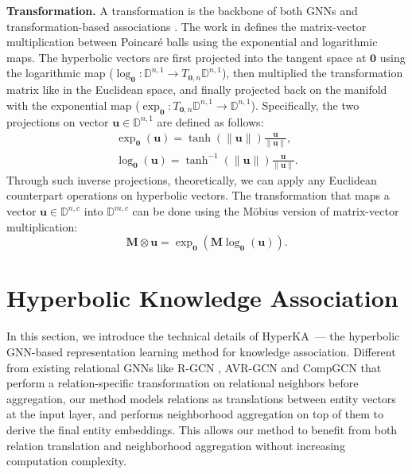\documentclass[11pt,a4paper]{article}
\newcommand{\modelname}{HyperKA\xspace}
\begin{document}
\noindent
\textbf{Transformation.} A transformation is the backbone of both GNNs \cite{HGCNN,HGCN} and transformation-based associations \cite{MTransE,JOIE}. The work in \cite{HNN} defines the matrix-vector multiplication between Poincaré balls using the exponential and logarithmic maps. The hyperbolic vectors are first projected into the tangent space at $\mathbf{0}$ using the logarithmic map ($\log_{\mathbf{0}}:\mathbb{D}^{n,1}\to T_{\mathbf{0},n}\mathbb{D}^{n,1}$), then multiplied the transformation matrix like in the Euclidean space, and finally projected back on the manifold with the exponential map ($\exp_{\mathbf{0}}:T_{\mathbf{0},n}\mathbb{D}^{n,1}\to \mathbb{D}^{n,1}$). Specifically, the two projections on vector $\mathbf{u}\in\mathbb{D}^{n,1}$ are defined as follows:
\begin{align}\label{eq:exp}
	\exp_{\mathbf{0}}(\mathbf{u}) = \tanh(\|\mathbf{u}\|)\frac{\mathbf{u}}{\|\mathbf{u}\|},\\
	\log_{\mathbf{0}}(\mathbf{u}) = \tanh^{-1}(\|\mathbf{u}\|)\frac{\mathbf{u}}{\|\mathbf{u}\|}.
\end{align}
Through such inverse projections, theoretically, we can apply any Euclidean counterpart operations on hyperbolic vectors. The transformation that maps a vector $\mathbf{u}\in\mathbb{D}^{n,c}$ into $\mathbb{D}^{m,c}$ can be done using the M\"obius version of matrix-vector multiplication:
\begin{equation}
\label{eq:multiplication}
  \mathbf{M}\otimes\mathbf{u} = \exp_{\mathbf{0}}(\mathbf{M}\log_{\mathbf{0}}(\mathbf{u})).
\end{equation}
 \section{Hyperbolic Knowledge Association}
In this section, we introduce the technical details of \modelname\ --- the hyperbolic GNN-based representation learning method for knowledge association. Different from existing relational GNNs like R-GCN \cite{R-GCN}, AVR-GCN \cite{AVR-GCN} and CompGCN \cite{CompGCN} that perform a relation-specific transformation on relational neighbors before aggregation, our method models relations as translations between entity vectors at the input layer, and performs neighborhood aggregation on top of them to derive the final entity embeddings. This allows our method to benefit from both relation translation and neighborhood aggregation without increasing computation complexity.
\end{document}
